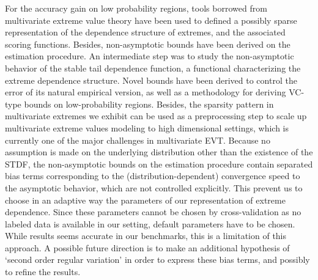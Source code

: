For the accuracy gain on low probability regions, tools borrowed from multivariate extreme value theory have been used to defined a possibly sparse representation of the dependence structure of extremes, and the associated scoring functions. Besides, non-asymptotic bounds have been derived on the estimation procedure.
An intermediate step was to study the non-asymptotic behavior of the stable tail dependence function, a functional characterizing the extreme dependence structure. 
Novel bounds have been derived to control the error of its natural empirical version, as well as a methodology for deriving VC-type bounds on low-probability regions.
Besides, the sparsity pattern in multivariate extremes we exhibit can be used as a preprocessing step to scale up multivariate extreme values modeling to high dimensional settings, which is currently one of the major challenges in multivariate EVT.
%
Because no assumption is made on the underlying distribution other than the existence of the STDF, the non-asymptotic bounds on the estimation procedure contain separated bias terms corresponding to the (distribution-dependent) convergence speed to the asymptotic behavior, which are not controlled explicitly.
This prevent us to choose in an adaptive way the parameters of our representation of extreme dependence. Since these parameters cannot be chosen by cross-validation as no labeled data is available in our setting, default parameters have to be chosen. While results seems accurate in our benchmarks, this is a limitation of this approach.
A possible future direction is to make an additional hypothesis of  `second order regular variation'  \citep[see \emph{e.g.}][]{deHaan1996} in order to express these bias terms, and possibly to refine the results.

